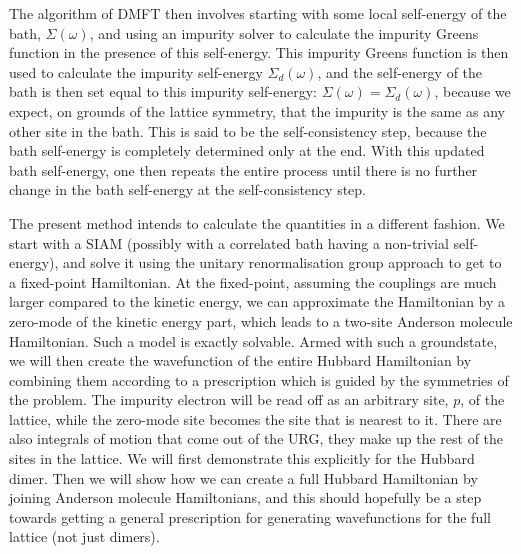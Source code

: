 \documentclass[12pt]{article}
\numberwithin{equation}{section}
\begin{document}
The algorithm of DMFT then involves starting with some local self-energy of the bath, \(\Sigma(\omega)\), and using an impurity solver to calculate the impurity Greens function in the presence of this self-energy. This impurity Greens function is then used to calculate the impurity self-energy \(\Sigma_d(\omega)\), and the self-energy of the bath is then set equal to this impurity self-energy: \(\Sigma(\omega) = \Sigma_d(\omega)\), because we expect, on grounds of the lattice symmetry, that the impurity is the same as any other site in the bath. This is said to be the self-consistency step, because the bath self-energy is completely determined only at the end. With this updated bath self-energy, one then repeats the entire process until there is no further change in the bath self-energy at the self-consistency step.


The present method intends to calculate the quantities in a different fashion. We start with a SIAM (possibly with a correlated bath having a non-trivial self-energy), and solve it using the unitary renormalisation group approach to get to a fixed-point Hamiltonian. At the fixed-point, assuming the couplings are much larger compared to the kinetic energy, we can approximate the Hamiltonian by a zero-mode of the kinetic energy part, which leads to a two-site Anderson molecule Hamiltonian. Such a model is exactly solvable. Armed with such a groundstate, we will then create the wavefunction of the entire Hubbard Hamiltonian by combining them according to a prescription which is guided by the symmetries of the problem. The impurity electron will be read off as an arbitrary site, \(p\), of the lattice, while the zero-mode site becomes the site that is nearest to it. There are also integrals of motion that come out of the URG, they make up the rest of the sites in the lattice. We will first demonstrate this explicitly for the Hubbard dimer. Then we will show how we can create a full Hubbard Hamiltonian by joining Anderson molecule Hamiltonians, and this should hopefully be a step towards getting a general prescription for generating wavefunctions for the full lattice (not just dimers).
\end{document}
